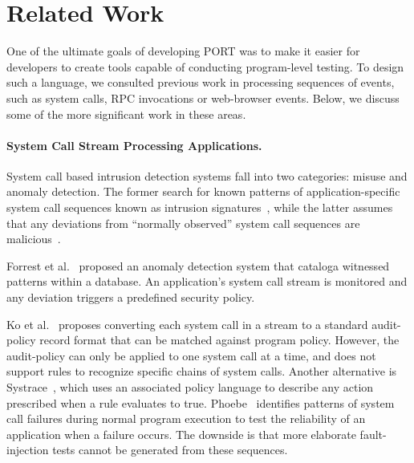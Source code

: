 \section{Related Work}
\label{SEC:related-work}

One of the ultimate goals of developing PORT
was to make it easier for developers to
create tools capable of
conducting program-level testing.
To design such a language,
we consulted
previous work
in processing sequences of events, such as
system calls, RPC invocations or
web-browser events.
Below, we discuss some of the more significant work in these areas.

\paragraph{System Call Stream Processing Applications.}

System call based intrusion detection systems fall into two categories: misuse and anomaly detection.
The former search for known patterns of application-specific
system call
sequences known as intrusion signatures~\cite{GARCIATEODORO200918}, while
the latter assumes that
any deviations
from ``normally observed'' system call sequences are
malicious~\cite{DBLP:conf/sp/ForrestHSL96}.

Forrest et al.~\cite{DBLP:conf/sp/ForrestHSL96} proposed 
an anomaly detection system that cataloga  witnessed patterns  within a database.
An application's system call stream
is monitored and any
deviation triggers a
predefined security policy.


Ko et al.~\cite{DBLP:conf/acsac/KoFL94} 
proposes converting each system call in a
stream to a standard audit-policy record format that can be 
matched against program policy. 
However, the audit-policy can only be applied to
one system call at a time,
and does not support rules to recognize specific chains of system calls.
Another alternative is
Systrace~\cite{DBLP:conf/uss/Provos03},
which uses an associated policy language 
to describe any action prescribed when a rule evaluates to true.
Phoebe~\cite{DBLP:journals/corr/abs-2006-04444}
identifies patterns of system call failures during normal program execution
to test the reliability of an application when a failure occurs.
The downside is that more elaborate fault-injection
tests cannot be generated from these sequences.

